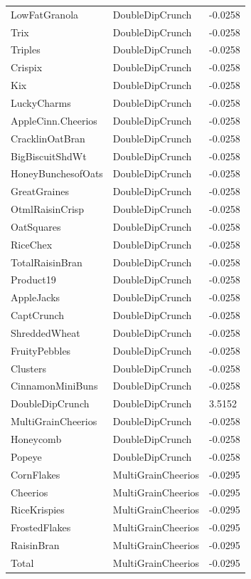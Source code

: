 \begin{table}[!htbp]
\begin{tabular}{lll}
LowFatGranola & DoubleDipCrunch & -0.0258
\\
Trix & DoubleDipCrunch & -0.0258
\\
Triples & DoubleDipCrunch & -0.0258
\\
Crispix & DoubleDipCrunch & -0.0258
\\
Kix & DoubleDipCrunch & -0.0258
\\
LuckyCharms & DoubleDipCrunch & -0.0258
\\
AppleCinn.Cheerios & DoubleDipCrunch & -0.0258
\\
CracklinOatBran & DoubleDipCrunch & -0.0258
\\
BigBiscuitShdWt & DoubleDipCrunch & -0.0258
\\
HoneyBunchesofOats & DoubleDipCrunch & -0.0258
\\
GreatGraines & DoubleDipCrunch & -0.0258
\\
OtmlRaisinCrisp & DoubleDipCrunch & -0.0258
\\
OatSquares & DoubleDipCrunch & -0.0258
\\
RiceChex & DoubleDipCrunch & -0.0258
\\
TotalRaisinBran & DoubleDipCrunch & -0.0258
\\
Product19 & DoubleDipCrunch & -0.0258
\\
AppleJacks & DoubleDipCrunch & -0.0258
\\
CaptCrunch & DoubleDipCrunch & -0.0258
\\
ShreddedWheat & DoubleDipCrunch & -0.0258
\\
FruityPebbles & DoubleDipCrunch & -0.0258
\\
Clusters & DoubleDipCrunch & -0.0258
\\
CinnamonMiniBuns & DoubleDipCrunch & -0.0258
\\
DoubleDipCrunch & DoubleDipCrunch & 3.5152
\\
MultiGrainCheerios & DoubleDipCrunch & -0.0258
\\
Honeycomb & DoubleDipCrunch & -0.0258
\\
Popeye & DoubleDipCrunch & -0.0258
\\
CornFlakes & MultiGrainCheerios & -0.0295
\\
Cheerios & MultiGrainCheerios & -0.0295
\\
RiceKrispies & MultiGrainCheerios & -0.0295
\\
FrostedFlakes & MultiGrainCheerios & -0.0295
\\
RaisinBran & MultiGrainCheerios & -0.0295
\\
Total & MultiGrainCheerios & -0.0295

\end{tabular}
\end{table}
